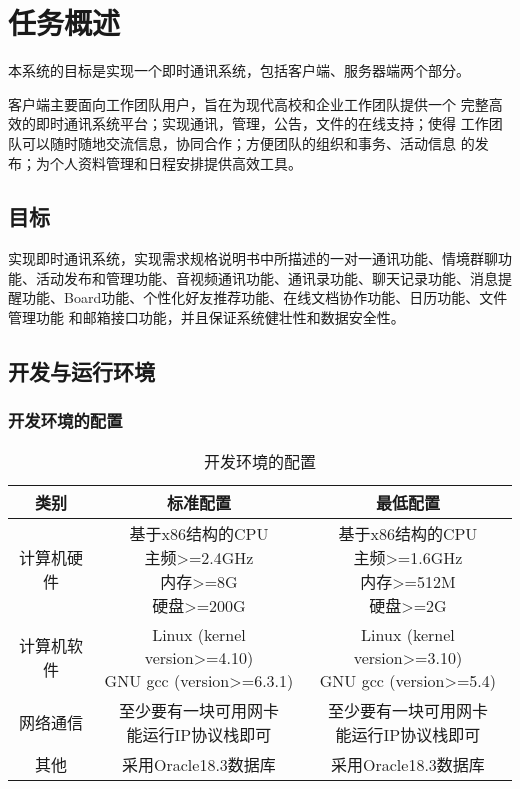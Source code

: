\chapter{\color{red} 任务概述}
本系统的目标是实现一个即时通讯系统，包括客户端、服务器端两个部分。

客户端主要面向工作团队用户，旨在为现代高校和企业工作团队提供一个
完整高效的即时通讯系统平台；实现通讯，管理，公告，文件的在线支持；使得
工作团队可以随时随地交流信息，协同合作；方便团队的组织和事务、活动信息
的发布；为个人资料管理和日程安排提供高效工具。

\section{目标}
实现即时通讯系统，实现需求规格说明书中所描述的一对一通讯功能、情境群聊功能、活动发布和管理功能、音视频通讯功能、通讯录功能、聊天记录功能、消息提醒功能、Board功能、个性化好友推荐功能、在线文档协作功能、日历功能、文件管理功能
和邮箱接口功能，并且保证系统健壮性和数据安全性。

\section{开发与运行环境}

\subsection{开发环境的配置}
\begin{table}[htbp]
\centering
\caption{开发环境的配置} \label{tab:development-environment}
\begin{tabular}{|c|c|c|}
    \hline
    类别 & 标准配置 & 最低配置 \\
    \hline
    计算机硬件 & \tabincell{c}{基于x86结构的CPU\\ 主频>=2.4GHz\\ 内存>=8G\\ 硬盘>=200G} & \tabincell{c}{基于x86结构的CPU\\ 主频>=1.6GHz\\ 内存>=512M\\ 硬盘>=2G} \\
    \hline
    计算机软件 & \tabincell{c}{Linux (kernel version>=4.10)\\ GNU gcc (version>=6.3.1)} & \tabincell{c}{Linux (kernel version>=3.10)\\ GNU gcc (version>=5.4)} \\
    \hline
    网络通信 & \tabincell{c}{至少要有一块可用网卡\\ 能运行IP协议栈即可} & \tabincell{c}{至少要有一块可用网卡\\ 能运行IP协议栈即可} \\
    \hline
    其他 & 采用Oracle18.3数据库 & 采用Oracle18.3数据库 \\
    \hline
\end{tabular}
\end{table}

